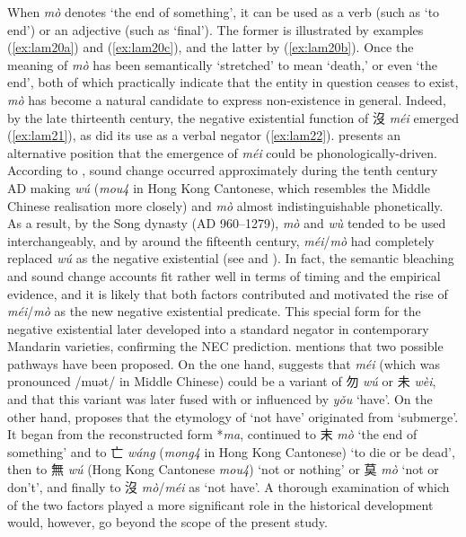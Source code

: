 \documentclass[output=paper,colorlinks,citecolor=brown,chinesefont]{langscibook}
\begin{document}
When \textit{mò} denotes `the end of something', it can be used as a verb (such as `to end') or an adjective (such as `final'). The former is illustrated by examples (\ref{ex:lam20a}) and (\ref{ex:lam20c}), and the latter by (\ref{ex:lam20b}). Once the meaning of \textit{mò} has been semantically `stretched' to mean `death,' or even `the end', both of which practically indicate that the entity in question ceases to exist, \textit{mò} has become a natural candidate to express non-existence in general. Indeed, by the late thirteenth century, the negative existential function of {\cn 沒} \textit{méi} emerged (\ref{ex:lam21}), as did its use as a verbal negator (\ref{ex:lam22}). \citet{Xu2003} presents an alternative position that the emergence of \textit{méi} could be phonologically-driven. According to \citeauthor{Xu2003}, sound change occurred approximately during the tenth century AD making \textit{wú} (\textit{mou4} in Hong Kong Cantonese, which resembles the Middle Chinese realisation more closely) and \textit{mò} almost indistinguishable phonetically. As a result, by the Song dynasty (AD 960–1279), \textit{mò} and \textit{wù} tended to be used interchangeably, and by around the fifteenth century, \textit{méi}/\textit{mò} had completely replaced \textit{wú} as the negative existential (see \citealt{PanW2002} and \citealt{Xu2003}). In fact, the semantic bleaching and sound change accounts fit rather well in terms of timing and the empirical evidence, and it is likely that both factors contributed and motivated the rise of \textit{méi}/\textit{mò} as the new negative existential predicate. This special form for the negative existential later developed into a standard negator in contemporary Mandarin varieties, confirming the NEC prediction. \citet[376--377, 517--518]{Schuessler2007} mentions that two possible pathways have been proposed. On the one hand, \citet[126]{Norman1988} suggests that \textit{méi} (which was pronounced /muət/ in Middle Chinese) could be a variant of
{\cn 勿} \textit{wú} or
{\cn 未} \textit{wèi}, and that this variant was later fused with or influenced by \textit{yǒu} `have'. On the other hand, \citet[121]{Pulleyblank1973} proposes that the etymology of `not have' originated from `submerge'. It began from the reconstructed form *\textit{ma}, continued to
{\cn 末} \textit{mò} `the end of something' and to
{\cn 亡} \textit{wáng} (\textit{mong4} in Hong Kong Cantonese) `to die or be dead', then to
{\cn 無} \textit{wú} (Hong Kong Cantonese \textit{mou4}) `not or nothing' or
{\cn 莫} \textit{mò} `not or don't', and finally to
{\cn 沒} \textit{mò}/\textit{méi} as `not have'. A thorough examination of which of the two factors played a more significant role in the historical development would, however, go beyond the scope of the present study.
\end{document}
